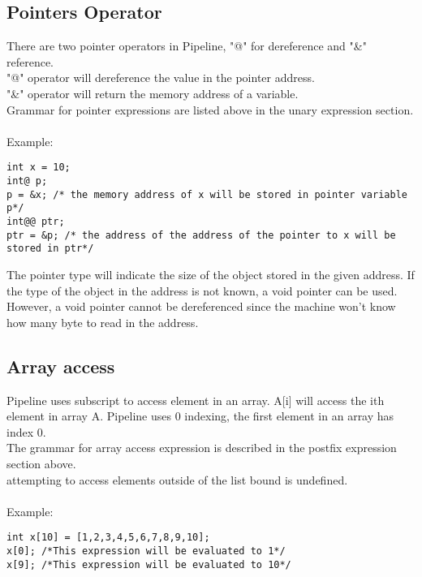 \documentclass[./LRM_main.tex]{subfiles}
\begin{document}
\subsection{Pointers Operator}
There are two pointer operators in Pipeline, "@" for dereference and "\&" reference.\\
"@" operator will dereference the value in the pointer address.\\
"\&" operator will return the memory address of a variable.\\
Grammar for pointer expressions are listed above in the unary expression section.\\
\vspace{1 mm}\\
Example:
\begin{lstlisting}
int x = 10;
int@ p;
p = &x; /* the memory address of x will be stored in pointer variable p*/
int@@ ptr;
ptr = &p; /* the address of the address of the pointer to x will be stored in ptr*/
\end{lstlisting}
The pointer type will indicate the size of the object stored in the given address. If the type of the object in the address is not known, a void pointer can be used. However, a void pointer cannot be dereferenced since the machine won't know how many byte to read in the address. 
\subsection{Array access}
Pipeline uses subscript to access element in an array. A[i] will access the ith element in array A. Pipeline uses 0 indexing, the first element in an array has index 0.\\
The grammar for array access expression is described in the postfix expression section above.\\
attempting to access elements outside of the list bound is undefined.\\
\pagebreak\\
Example:
\begin{lstlisting}
int x[10] = [1,2,3,4,5,6,7,8,9,10];
x[0]; /*This expression will be evaluated to 1*/
x[9]; /*This expression will be evaluated to 10*/
\end{lstlisting}
\end{document}
